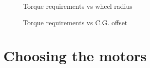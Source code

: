 \begin{figure}[!h]
\centering
\caption{Torque requirements vs wheel radius}
\label{fig:4_rewac_radius}
\end{figure}

\begin{figure}[!h]
\centering
\caption{Torque requirements vs C.G. offset}
\label{fig:4_rewac_dist}
\end{figure}

\section{Choosing the motors}








